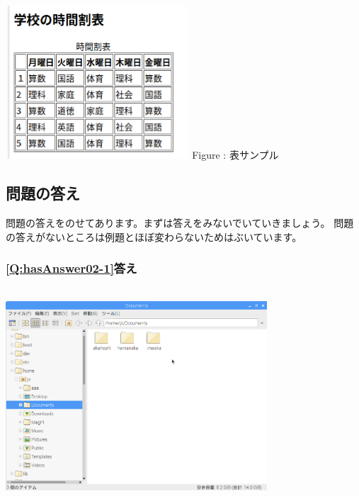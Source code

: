 \documentclass[a4paper,12pt]{jarticle}
\begin{document}
\begin{minipage}{6.839cm}
  {\upshape
    \includegraphics[width=6.839cm,height=5.727cm]{textbook-img211.png}
    \newline
    Figure {\theFigure\label{seq:refFigure45}}:
    表サンプル}
\end{minipage}

\bigskip

\flushleft
\clearpage\subsection{\bfseries
  問題の答え}

問題の答えをのせてあります。まずは答えをみないでいていきましょう。\newline
問題の答えがないところは例題とほぼ変わらないためはぶいています。

\subsubsection{\bfseries
  \ref*{Q:hasAnswer02-1}答え}

\bigskip


\centering
\includegraphics[width=9.763cm,height=8.038cm]{textbook-img212.png}
\flushleft
\end{document}
